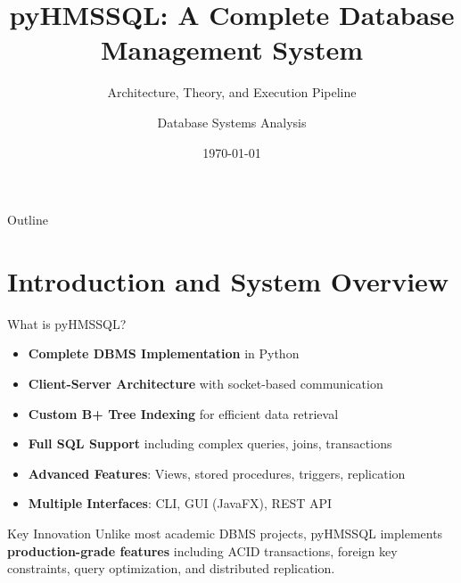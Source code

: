 \documentclass[aspectratio=169]{beamer}
\title{pyHMSSQL: A Complete Database Management System}
\subtitle{Architecture, Theory, and Execution Pipeline}
\author{Database Systems Analysis}
\date{\today}
\begin{document}
\frame{\titlepage}

\begin{frame}{Outline}
\tableofcontents
\end{frame}

\section{Introduction and System Overview}

\begin{frame}{What is pyHMSSQL?}
\begin{itemize}
    \item \textbf{Complete DBMS Implementation} in Python
    \item \textbf{Client-Server Architecture} with socket-based communication
    \item \textbf{Custom B+ Tree Indexing} for efficient data retrieval
    \item \textbf{Full SQL Support} including complex queries, joins, transactions
    \item \textbf{Advanced Features}: Views, stored procedures, triggers, replication
    \item \textbf{Multiple Interfaces}: CLI, GUI (JavaFX), REST API
\end{itemize}

\vspace{0.3cm}
\begin{block}{Key Innovation}
Unlike most academic DBMS projects, pyHMSSQL implements \textbf{production-grade features} including ACID transactions, foreign key constraints, query optimization, and distributed replication.
\end{block}
\end{frame}
\end{document}
